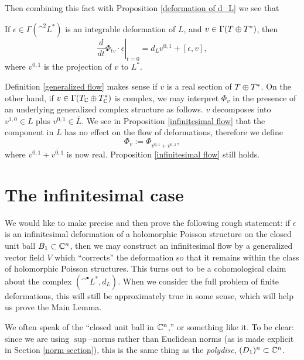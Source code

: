 \documentclass{article}
\begin{document}
Then combining this fact with Proposition \ref{deformation of d_L} we see that
\begin{prop}\label{infinitesimal flow}
If $\epsilon \in \Gamma(\^ ^2 L^*)$ is an integrable deformation of $L$, and $v \in \Gamma(T\oplus T^*)$, then
$$\left.\frac{d}{dt}\Phi_{tv}\cdot \epsilon\right|_{t=0} = d_L v^{0,1} + [\epsilon,v],$$
where $v^{0,1}$ is the projection of $v$ to $L^*$.
\end{prop}


\begin{rem}
Definition \ref{generalized flow} makes sense if $v$ is a real section of ${T\oplus T^*}$.  On the other hand, if $v \in \Gamma(T_\mathbb C \oplus T^*_\mathbb C)$ is complex, we may interpret $\Phi_v$ in the presence of an underlying generalized complex structure as follows.  $v$ decomposes into $v^{1,0}\in L$ plus $v^{0,1}\in\bar{L}$.  We see in Proposition \ref{infinitesimal flow} that the component in $L$ has no effect on the flow of deformations, therefore we define
$$\Phi_v := \Phi_{v^{0,1} + \overline{v^{0,1}}},$$
where $v^{0,1} + \overline{v^{0,1}}$ is now real.  Proposition \ref{infinitesimal flow} still holds.
\end{rem}



\section{The infinitesimal case}\label{infinitesimal case}

We would like to make precise and then prove the following rough statement: if $\epsilon$ is an infinitesimal deformation of a holomorphic Poisson structure on the closed unit ball $B_1 \subset \mathbb C^n$, then we may construct an infinitesimal flow by a generalized vector field $V$ which ``corrects'' the deformation so that it remains within the class of holomorphic Poisson structures.  This turns out to be a cohomological claim about the complex $(\^ ^\bullet L^*, d_L)$.  When we consider the full problem of finite deformations, this will still be approximately true in some sense, which will help us prove the Main Lemma.

\begin{rem}
We often speak of the ``closed unit ball in $\mathbb C^n$,'' or something like it.  To be clear: since we are using $\sup$--norms rather than Euclidean norms (as is made explicit in Section \ref{norm section}), this is the same thing as the \emph{polydisc}, ${(D_1)^n \subset \mathbb C^n}$.
\end{rem}
\end{document}
